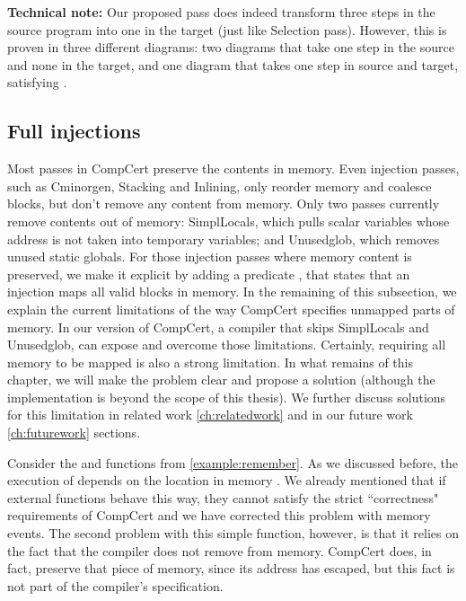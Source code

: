 \noindent \textbf{Technical note:} Our proposed pass does indeed transform three steps in the source program into one in the target (just like Selection pass). However, this is proven  in three different diagrams: two diagrams that take one step in the source and none in the target, and one diagram that takes one step in source and target, satisfying  . 

   
\subsection{Full injections}\label{sec:fullinjections} Most passes in CompCert preserve the contents in memory. Even injection passes, such as Cminorgen, Stacking and Inlining, only reorder memory and coalesce blocks, but don't remove any content from memory. Only two passes currently remove contents out of memory: SimplLocals, which pulls scalar variables whose address is not taken into temporary variables; and Unusedglob, which removes unused static globals. For those injection passes where memory content is preserved, we make it explicit by adding a predicate , that states that an injection maps all valid blocks in memory. In the remaining of this subsection, we explain the current limitations of the way CompCert specifies unmapped parts of memory. In our version of CompCert, a compiler that skips SimplLocals and Unusedglob, can expose  and overcome those limitations. Certainly, requiring all memory to be mapped is also a strong limitation. In what remains of this chapter, we will make the problem clear and propose a solution (although the implementation is beyond the scope of this thesis). We further discuss solutions for this limitation in related work \cref{ch:relatedwork} and in our future work \cref{ch:futurework} sections.

Consider the  and  functions from \cref{example:remember}. As we discussed before, the execution of  depends on the location in memory . We already mentioned that if external functions behave this way, they cannot satisfy the strict ``correctness" requirements of CompCert and we have corrected this problem with memory events. The second problem with this simple function, however, is that it relies on the fact that the compiler does not remove  from memory. CompCert does, in fact, preserve that piece of memory, since its address has escaped, but this fact is not part of the compiler's specification. 

